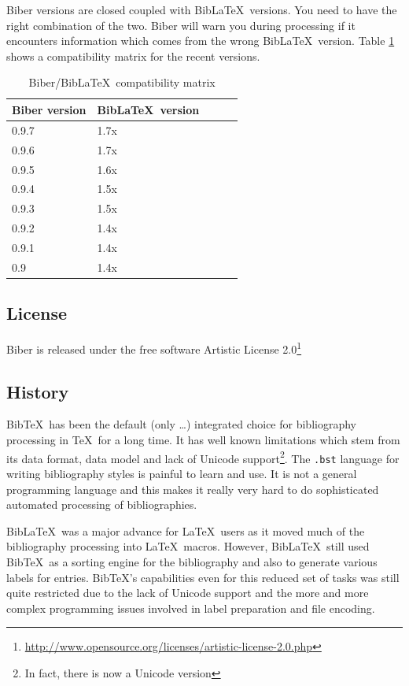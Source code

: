 \documentclass{ltxdockit}
\begin{document}
Biber versions are closed coupled with Bib\LaTeX\ versions. You
need to have the right combination of the two. Biber will warn you
during processing if it encounters information which comes from the wrong
Bib\LaTeX\ version. Table \ref{tab:compat} shows a compatibility
matrix for the recent versions.

\begin{table}
\begin{center}
\small
\begin{tabular}{lllll}
\toprule
Biber version & Bib\LaTeX\ version\\
\midrule
0.9.7 & 1.7x\\
0.9.6 & 1.7x\\
0.9.5 & 1.6x\\
0.9.4 & 1.5x\\
0.9.3 & 1.5x\\
0.9.2 & 1.4x\\
0.9.1 & 1.4x\\
0.9 & 1.4x\\
\bottomrule
\end{tabular}
\end{center}
\caption{Biber/Bib\LaTeX\ compatibility matrix}
\label{tab:compat}
\end{table}

\subsection{License}

Biber is released under the free software Artistic License 2.0\footnote{\url{http://www.opensource.org/licenses/artistic-license-2.0.php}}

\subsection{History}

Bib\TeX\ has been the default (only \ldots) integrated choice for
bibliography processing in \TeX\ for a long time. It has well known
limitations which stem from its data format, data model and lack of Unicode
support\footnote{In fact, there is now a Unicode version}. The
\verb+.bst+ language for writing bibliography styles is painful to learn
and use. It is not a general programming language and this makes it really
very hard to do sophisticated automated processing of bibliographies.

Bib\LaTeX\ was a major advance for \LaTeX\ users as it moved much
of the bibliography processing into \LaTeX\ macros. However,
Bib\LaTeX\ still used Bib\TeX\ as a sorting engine for the
bibliography and also to generate various labels for
entries. Bib\TeX's capabilities even for this reduced set of
tasks was still quite restricted due to the lack of Unicode support and
the more and more complex programming issues involved in label
preparation and file encoding.
\end{document}
